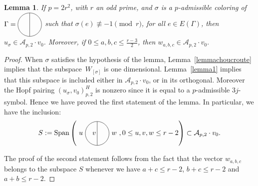 \documentclass[11pt]{article}
\newcommand{\Span}{\operatorname{Span}}
\newcommand{\thetagraph}[3]{
\tikz[scale=0.3,baseline=-0.5ex]{
\draw (0,0) circle (2);
\draw (0,2)--(0,-2);
\draw (-2,0) node[left]{#1};
\draw (0.2,0) node[left]{#2};
\draw (2,0) node[right]{#3};
}
}
\newcommand{\Thetagraph}{
\tikz[scale=0.3,baseline=-0.5ex]{
\draw (0,0) circle (2);
\draw (0,2)--(0,-2);
}
}
\numberwithin{equation}{section}
\newtheorem{Lemma}[Theorem]{Lemma}
\begin{document}
\begin{Lemma}\label{lemma3}If $p=2r^2$, with $r$ an odd prime, and $\sigma$ is a $p$-admissible coloring of $\Gamma=\Thetagraph$ such that $\sigma(e) \not\equiv -1 \pmod{r}$, for all $e\in E(\Gamma)$, then $u_{\sigma}\in \mathcal{A}_{p,2}\cdot v_0$. Moreover, if $0\leq a,b,c \leq \frac{r-3}{2}$, then $w_{a,b,c}\in \mathcal{A}_{p,2}\cdot v_0$.
\end{Lemma}

\begin{proof} When $\sigma$ satisfies the hypothesis of the lemma, Lemma~\ref{lemmachoucroute} implies that the sub\-spa\-ce~$W_{[\sigma]}$ is one dimensional. Lemma~\ref{lemma1} implies that this subspace is included either in $\mathcal{A}_{p,2}\cdot v_0$, or in its orthogonal. Moreover the Hopf pairing $\left( u_{\sigma}, v_0 \right)^H_{p,2}$ is nonzero since it is equal to a $p$-admissible $3j$-symbol. Hence we have proved the first statement of the lemma. In particular, we have the inclusion:
\begin{gather*} S:=\Span \left(\thetagraph{$u$}{$v$}{$w$}, 0\leq u,v,w \leq r-2 \right) \subset \mathcal{A}_{p,2}\cdot v_0.\end{gather*}

The proof of the second statement follows from the fact that the vector $w_{a,b,c}$ belongs to the subspace $S$ whenever we have $a+c\leq r-2$, $b+c\leq r-2$ and $a+b\leq r-2$.
\end{proof}
\end{document}
